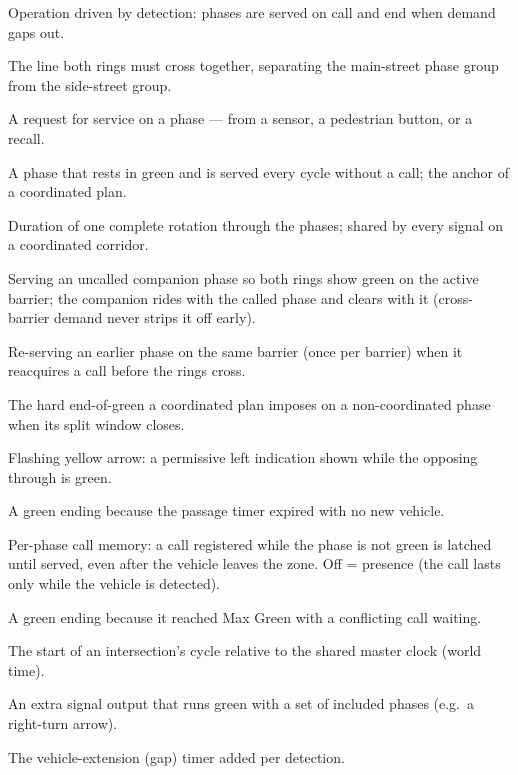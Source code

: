 \documentclass[11pt]{article}
\begin{document}
\begin{description}[nosep,leftmargin=4.2cm,style=nextline]
  \item[Actuated] Operation driven by detection: phases are served on call and end
    when demand gaps out.
  \item[Barrier] The line both rings must cross together, separating the
    main-street phase group from the side-street group.
  \item[Call] A request for service on a phase — from a sensor, a pedestrian
    button, or a recall.
  \item[Coordinated phase] A phase that rests in green and is served every cycle
    without a call; the anchor of a coordinated plan.
  \item[Cycle length] Duration of one complete rotation through the phases; shared
    by every signal on a coordinated corridor.
  \item[Dual entry (DE)] Serving an uncalled companion phase so both rings show
    green on the active barrier; the companion rides with the called phase and
    clears with it (cross-barrier demand never strips it off early).
  \item[Conditional service (CS)] Re-serving an earlier phase on the same barrier
    (once per barrier) when it reacquires a call before the rings cross.
  \item[Force-off] The hard end-of-green a coordinated plan imposes on a
    non-coordinated phase when its split window closes.
  \item[FYA] Flashing yellow arrow: a permissive left indication shown while the
    opposing through is green.
  \item[Gap-out] A green ending because the passage timer expired with no new
    vehicle.
  \item[Locking memory (LOCK)] Per-phase call memory: a call registered while the
    phase is not green is latched until served, even after the vehicle leaves the
    zone. Off = presence (the call lasts only while the vehicle is detected).
  \item[Max-out] A green ending because it reached Max Green with a conflicting
    call waiting.
  \item[Offset] The start of an intersection's cycle relative to the shared master
    clock (world time).
  \item[Overlap] An extra signal output that runs green with a set of included
    phases (e.g.\ a right-turn arrow).
  \item[Passage] The vehicle-extension (gap) timer added per detection.

\end{description}
\end{document}
